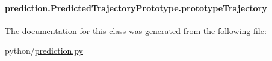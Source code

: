 \hypertarget{classprediction_1_1PredictedTrajectoryPrototype_aa7ffee6d30ebbcafe7134c36c6a24d37}{
\paragraph[{prototype\-Trajectory}]{\setlength{\rightskip}{0pt plus 5cm}prediction.\-Predicted\-Trajectory\-Prototype.\-prototype\-Trajectory}}\label{classprediction_1_1PredictedTrajectoryPrototype_aa7ffee6d30ebbcafe7134c36c6a24d37}


The documentation for this class was generated from the following file\-:\begin{DoxyCompactItemize}
\item 
python/\hyperlink{prediction_8py}{prediction.\-py}\end{DoxyCompactItemize}
